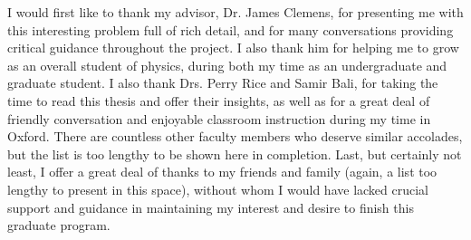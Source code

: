 \documentclass[12pt, oneside]{book}
\begin{document}
\noindent I would first like to thank my advisor, Dr. James Clemens, for presenting me with this interesting problem full of rich detail, and for many conversations providing critical guidance throughout the project. I also thank him for helping me to grow as an overall student of physics, during both my time as an undergraduate and graduate student. I also thank Drs. Perry Rice and Samir Bali, for taking the time to read this thesis and offer their insights, as well as for a great deal of friendly conversation and enjoyable classroom instruction during my time in Oxford. There are countless other faculty members who deserve similar accolades, but the list is too lengthy to be shown here in completion. Last, but certainly not least, I offer a great deal of thanks to my friends and family (again, a list too lengthy to present in this space), without whom I would have lacked crucial support and guidance in maintaining my interest and desire to finish this graduate program.

\mainmatter







\appendix





\backmatter



\end{document}
